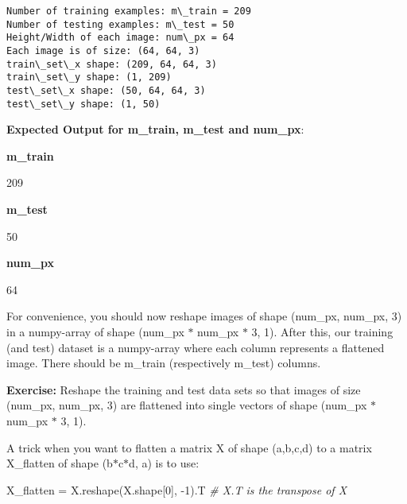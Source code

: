 \documentclass[11pt]{article}
\newenvironment{Shaded}{}{}
\newcommand{\DecValTok}[1]{\textcolor[rgb]{0.25,0.63,0.44}{{#1}}}
\newcommand{\CommentTok}[1]{\textcolor[rgb]{0.38,0.63,0.69}{\textit{{#1}}}}
\newcommand{\NormalTok}[1]{{#1}}
\begin{document}
    \begin{Verbatim}[commandchars=\\\{\}]
Number of training examples: m\_train = 209
Number of testing examples: m\_test = 50
Height/Width of each image: num\_px = 64
Each image is of size: (64, 64, 3)
train\_set\_x shape: (209, 64, 64, 3)
train\_set\_y shape: (1, 209)
test\_set\_x shape: (50, 64, 64, 3)
test\_set\_y shape: (1, 50)

    \end{Verbatim}

    \textbf{Expected Output for m\_train, m\_test and num\_px}:

\textbf{m\_train}

209

\textbf{m\_test}

50

\textbf{num\_px}

64

    For convenience, you should now reshape images of shape (num\_px,
num\_px, 3) in a numpy-array of shape (num\_px $*$ num\_px $*$ 3, 1).
After this, our training (and test) dataset is a numpy-array where each
column represents a flattened image. There should be m\_train
(respectively m\_test) columns.

\textbf{Exercise:} Reshape the training and test data sets so that
images of size (num\_px, num\_px, 3) are flattened into single vectors
of shape (num\_px $*$ num\_px $*$ 3, 1).

A trick when you want to flatten a matrix X of shape (a,b,c,d) to a
matrix X\_flatten of shape (b$*$c$*$d, a) is to use:

\begin{Shaded}
\begin{Highlighting}[]
\NormalTok{X_flatten = X.reshape(X.shape[}\DecValTok{0}\NormalTok{], -}\DecValTok{1}\NormalTok{).T      }\CommentTok{# X.T is the transpose of X}
\end{Highlighting}
\end{Shaded}
\end{document}
